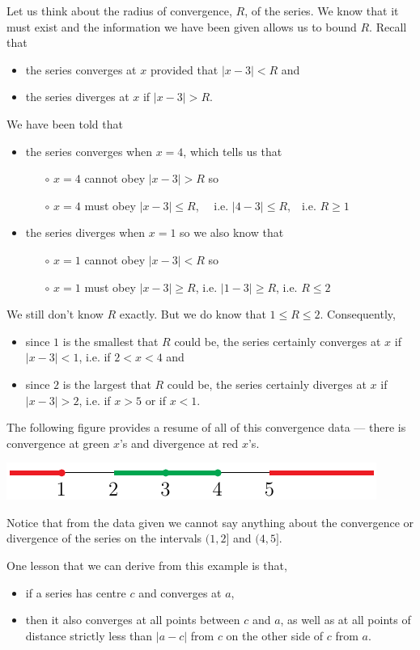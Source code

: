 \begin{eg}
Let us think about the radius of convergence, $R$, of the series. We know that it must exist and the information we have
been given allows us to bound $R$. Recall that
\begin{itemize}
\item the series converges at $x$ provided that $|x-3|<R$ and
\item the series diverges at $x$ if $|x-3|>R$.
\end{itemize}
We have been told that
\begin{itemize}
\item the series converges when $x=4$, which tells us that
\begin{itemize}
\item[$\circ$] $x=4$ cannot obey $|x-3|>R$ so
\item[$\circ$] $x=4$ must obey $|x-3|\le R$, \ \ i.e. $|4-3|\le R$,\ \
 i.e. $R\ge 1$
\end{itemize}
\item the series diverges when $x=1$ so we also know that
\begin{itemize}
\item[$\circ$] $x=1$ cannot obey $|x-3|<R$ so
\item[$\circ$] $x=1$ must obey $|x-3|\ge R$, i.e. $|1-3|\ge R$, i.e. $R\le 2$
\end{itemize}
\end{itemize}
We still don't know $R$ exactly. But we do know that $1\le R\le 2$.
Consequently,
\begin{itemize}
\item since $1$ is the smallest that $R$ could be, the series
certainly converges at $x$ if $|x-3|<1$, i.e. if $2<x<4$ and
\item since $2$ is the largest that $R$ could be, the series
certainly diverges at $x$ if $|x-3|>2$, i.e. if $x>5$ or if $x<1$.
\end{itemize}
The following figure provides a resume of all of this convergence
data --- there is convergence at green $x$'s and divergence at
red $x$'s.
\begin{efig}
\begin{center}
     \includegraphics{convDivB.pdf}
\end{center}
\end{efig}
Notice that from the data given we cannot say anything about the
convergence or divergence of the series on the
intervals $(1,2]$ and $(4,5]$.

\noindent
One lesson that we can derive from this example is that,
\begin{itemize}
\item
if a series has centre $c$ and converges at $a$,
\item
then it also converges at all points between $c$ and $a$, as well
as at all points of distance strictly less than $|a-c|$ from $c$
on the other side of $c$ from $a$.
\end{itemize}
\end{eg}



